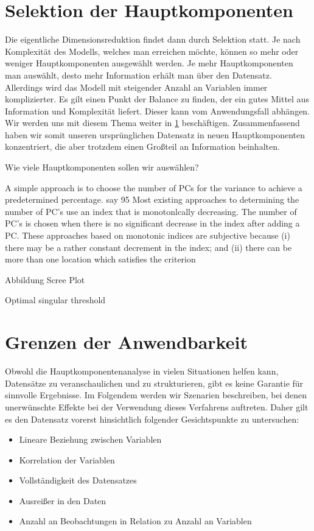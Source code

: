 \section{Selektion der Hauptkomponenten}
\label{selection_principal_components}

Die eigentliche Dimensionsreduktion findet dann durch Selektion statt. Je nach Komplexität des Modells, welches man erreichen möchte, können so mehr oder weniger Hauptkomponenten ausgewählt werden. Je mehr Hauptkomponenten man auswählt, desto mehr Information erhält man über den Datensatz. Allerdings wird das Modell mit steigender Anzahl an Variablen immer komplizierter. Es gilt einen Punkt der Balance zu finden, der ein gutes Mittel aus Information und Komplexität liefert. Dieser kann vom Anwendungsfall abhängen. Wir werden uns mit diesem Thema weiter in \ref{selection_principal_components} beschäftigen.
Zusammenfassend haben wir somit unseren ursprünglichen Datensatz in neuen Hauptkomponenten konzentriert, die aber trotzdem einen Großteil an Information beinhalten.

Wie viele Hauptkomponenten sollen wir auswählen?

A simple approach is to choose the number of
PCs for the variance to achieve a predetermined
percentage. say 95%
Most existing approaches to determining the number of PC's use an index that is monotonlcally
decreasing. The number of PC's is chosen when
there is no significant decrease in the index after
adding a PC. These approaches based on monotonic indices are subjective because (i) there may
be a rather constant decrement in the index; and
(ii) there can be more than one location which
satisfies the criterion

Abbildung Scree Plot

Optimal singular threshold \cite{gavish}

\section{Grenzen der Anwendbarkeit} \label{theo_results}

Obwohl die Hauptkomponentenanalyse in vielen Situationen helfen kann, Datensätze zu veranschaulichen und zu strukturieren, gibt es keine Garantie für sinnvolle Ergebnisse. Im Folgendem werden wir Szenarien beschreiben, bei denen unerwünschte Effekte bei der Verwendung dieses Verfahrens auftreten. Daher gilt es den Datensatz vorerst hinsichtlich folgender Gesichtspunkte zu untersuchen: 

\begin{itemize}
\item Lineare Beziehung zwischen Variablen
\item Korrelation der Variablen
\item Vollständigkeit des Datensatzes
\item Ausreißer in den Daten
\item Anzahl an Beobachtungen in Relation zu Anzahl an Variablen
\end{itemize}

